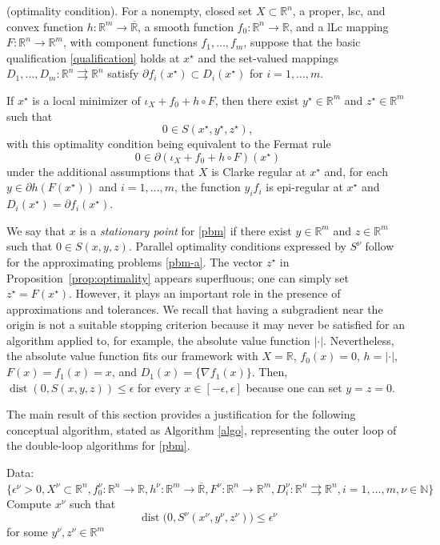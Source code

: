 \documentclass[smallextended,envcountsect]{svjour3}
\newcommand{\tto}{\rightrightarrows}
\newcommand{\nats}{\mathbb{N}}
\newcommand{\reals}{\mathbb{R}}
\newcommand{\Reals}{\overline{\mathbb{R}}}
\DeclareMathOperator{\dist}{dist}
\begin{document}
\begin{proposition}{\rm (optimality condition).}\label{prop:optimality} For a nonempty, closed set $X\subset\reals^n$, a proper, lsc, and convex function $h:\reals^m\to \Reals$, a smooth function $f_0:\reals^n\to \reals$, and a lLc mapping $F:\reals^n\to \reals^m$, with component functions $f_1, \dots, f_m$, suppose that the basic qualification \eqref{qualification} holds at $x^\star$ and the set-valued mappings $D_1, \dots, D_m:\reals^n\tto \reals^n$ satisfy $\partial f_i(x^\star) \subset D_i(x^\star)$ for $i = 1, \dots, m$.

If $x^\star$ is a local minimizer of $\iota_X + f_0 + h \circ F$, then there exist $y^\star\in\reals^m$ and $z^\star\in \reals^m$ such that 
\[
0 \in S(x^\star, y^\star, z^\star),
\]
with this optimality condition being equivalent to the Fermat rule 
\[
0 \in \partial(\iota_X + f_0 + h \circ F)(x^\star)
\]
under the additional assumptions that $X$ is Clarke regular at $x^\star$ and, for each $y\in \partial h(F(x^\star))$ and $i = 1, \dots, m$, the function $y_i f_i$ is epi-regular at $x^\star$ and $D_i(x^\star) = \partial f_i(x^\star)$.
\end{proposition}


We say that $x$ is a {\em stationary point} for \eqref{pbm} if there exist $y\in\reals^m$ and $z\in\reals^m$ such that $0 \in S(x,y,z)$. Parallel optimality conditions expressed by $S^\nu$ follow for the approximating problems \eqref{pbm-a}. The vector $z^\star$ in Proposition~\ref{prop:optimality} appears superfluous; one can simply set $z^\star = F(x^\star)$. However, it plays an important role in the presence of approximations and tolerances. We recall that having a subgradient near the origin is not a suitable stopping criterion because it may never be satisfied for an algorithm applied to, for example, the absolute value function $|\cdot|$. Nevertheless, the absolute value function fits our framework with $X = \reals$, $f_0(x) = 0$, $h = |\cdot|$, $F(x) = f_1(x) = x$, and $D_1(x) = \{\nabla f_1(x)\}$. Then, $\dist(0,S(x,y,z))\leq \epsilon$ for every $x\in [-\epsilon, \epsilon]$ because one can set $y = z = 0$.   

The main result of this section provides a justification for the following conceptual algorithm, stated as Algorithm \ref{algo}, representing the outer loop of the double-loop algorithms for \eqref{pbm}. 


\begin{algorithm}[htb]
\caption{Global Approximation Algorithm}
\label{algo}
\begin{algorithmic}[1]
{\footnotesize
\State Data: $\{\epsilon^\nu > 0, X^\nu\subset\reals^n, f_0^\nu:\reals^n\to \reals, h^\nu:\reals^m\to \Reals, F^\nu:\reals^n\to \reals^m, D_i^\nu:\reals^n\tto\reals^n, i=1, \dots, m, \nu\in\nats\}$
\State Compute $x^\nu$ such that
\begin{equation}\label{eqn:tol}
\dist\big(0, S^\nu(x^\nu,y^\nu,z^\nu)\big) \leq \epsilon^\nu
\end{equation}
\quad \;\;for some $y^\nu,z^\nu \in \reals^m$
\EndFor
}
  \end{algorithmic}
\end{algorithm}
\end{document}
